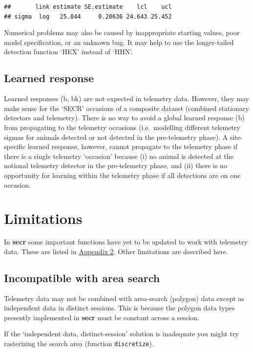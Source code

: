\documentclass[
]{book}
\begin{document}
\begin{verbatim}
##       link estimate SE.estimate    lcl    ucl
## sigma  log   25.044     0.20636 24.643 25.452
\end{verbatim}

Numerical problems may also be caused by inappropriate starting values, poor model specification, or an unknown bug. It may help to use the longer-tailed detection function `HEX' instead of `HHN'.

\subsection{Learned response}\label{learned-response}

Learned responses (b, bk) are not expected in telemetry data. However, they may make sense for the `SECR' occasions of a composite dataset (combined stationary detectors and telemetry). There is no way to avoid a global learned response (b) from propagating to the telemetry occasions (i.e.~modelling different telemetry sigmas for animals detected or not detected in the pre-telemetry phase). A site-specific learned response, however, cannot propagate to the telemetry phase if there is a single telemetry `occasion' because (i) no animal is detected at the notional telemetry detector in the pre-telemetry phase, and (ii) there is no opportunity for learning within the telemetry phase if all detections are on one occasion.

\section{Limitations}\label{telemetrylimitations}

In \textbf{secr} some important functions have yet to be updated to work with telemetry data. These are listed in \hyperref[telemetryappendix2]{Appendix 2}. Other limitations are described here.

\subsection{Incompatible with area search}\label{incompatible-with-area-search}

Telemetry data may not be combined with area-search (polygon) data except as independent data in distinct sessions. This is because the polygon data types presently implemented in \textbf{secr} must be constant across a session.

If the `independent data, distinct-session' solution is inadequate you might try rasterizing the search area (function \texttt{discretize}).
\end{document}
